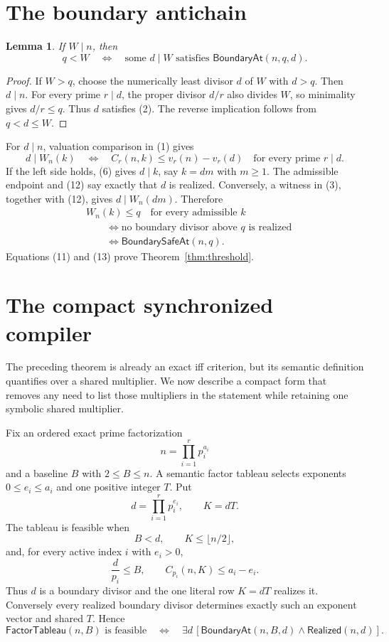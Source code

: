 \documentclass[11pt]{article}
\newtheorem{lemma}[theorem]{Lemma}
\theoremstyle{remark}
\newcommand{\BoundaryAt}{\mathsf{BoundaryAt}}
\newcommand{\Realized}{\mathsf{Realized}}
\newcommand{\BoundarySafeAt}{\mathsf{BoundarySafeAt}}
\newcommand{\FactorTableau}{\mathsf{FactorTableau}}
\begin{document}
\section{The boundary antichain}

\begin{lemma}\label{lem:boundary}
If $W\mid n$, then
\[
 q<W
 \quad\Longleftrightarrow\quad
 \text{some }d\mid W\text{ satisfies }\BoundaryAt(n,q,d).
\]
\end{lemma}

\begin{proof}
If $W>q$, choose the numerically least divisor $d$ of $W$ with $d>q$.
Then $d\mid n$.  For every prime $r\mid d$, the proper divisor $d/r$ also
divides $W$, so minimality gives $d/r\leq q$.  Thus $d$ satisfies (2).
The reverse implication follows from $q<d\leq W$.
\end{proof}

For $d\mid n$, valuation comparison in (1) gives
\[
 d\mid W_n(k)
 \quad\Longleftrightarrow\quad
 C_r(n,k)\leq v_r(n)-v_r(d)
 \quad\text{for every prime }r\mid d.                     \tag{12}
\]
If the left side holds, (6) gives $d\mid k$, say $k=dm$ with $m\geq1$.
The admissible endpoint and (12) say exactly that $d$ is realized.  Conversely,
a witness in (3), together with (12), gives $d\mid W_n(dm)$.  Therefore
\begin{equation}
 \begin{split}
 &W_n(k)\leq q\quad\text{for every admissible }k\\
 &\qquad\Longleftrightarrow
 \text{no boundary divisor above }q\text{ is realized}\\
 &\qquad\Longleftrightarrow \BoundarySafeAt(n,q).
 \end{split}
\tag{13}
\end{equation}
Equations (11) and (13) prove Theorem~\ref{thm:threshold}.

\section{The compact synchronized compiler}

The preceding theorem is already an exact iff criterion, but its semantic
definition quantifies over a shared multiplier.  We now describe a compact
form that removes any need to list those multipliers in the statement while
retaining one symbolic shared multiplier.

Fix an ordered exact prime factorization
\[
 n=\prod_{i=1}^{r}p_i^{a_i}
\]
and a baseline $B$ with $2\leq B\leq n$.  A semantic factor tableau selects
exponents $0\leq e_i\leq a_i$ and one positive integer $T$.  Put
\[
 d=\prod_{i=1}^{r}p_i^{e_i},\qquad K=dT.
\]
The tableau is feasible when
\[
 B<d,\qquad K\leq\lfloor n/2\rfloor,
\]
and, for every active index $i$ with $e_i>0$,
\[
 \frac{d}{p_i}\leq B,
 \qquad
 C_{p_i}(n,K)\leq a_i-e_i.                              \tag{14}
\]
Thus $d$ is a boundary divisor and the one literal row $K=dT$ realizes it.
Conversely every realized boundary divisor determines exactly such an
exponent vector and shared $T$.  Hence
\[
 \FactorTableau(n,B)\text{ is feasible}
 \quad\Longleftrightarrow\quad
 \exists d\,[\BoundaryAt(n,B,d)\wedge\Realized(n,d)].   \tag{15}
\]
\end{document}
